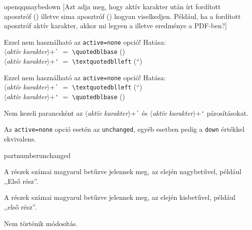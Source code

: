 \documentclass[12pt]{article}
\newcommand\param[1]{{\normalfont\slshape$\langle$#1$\rangle$}}
\begin{document}
\begin{description}
\begin{hunopt}{openqq}{maybedown}
[Azt adja meg, hogy aktív karakter után írt fordított aposztróf (\texttt{\textasciigrave}) illetve sima aposztróf (\texttt{\textquotesingle}) hogyan viselkedjen.
Például, ha a fordított aposztróf aktív karakter, akkor mi legyen a \texttt{\textasciigrave\textasciigrave} illetve \texttt{\textasciigrave\textquotesingle} eredménye a PDF-ben?]
\item[down]
Ezzel nem használható az \texttt{active=none} opció! Hatása:\\
\param{aktív karakter}+\verb|`| $=$ \verb|\quotedblbase| (\quotedblbase)\\
\param{aktív karakter}+\verb|'| $=$ \verb|\textquotedblleft| (\textquotedblleft)
\item[up]
Ezzel nem használható az \texttt{active=none} opció! Hatása:\\
\param{aktív karakter}+\verb|`| $=$ \verb|\textquotedblleft| (\textquotedblleft)\\
\param{aktív karakter}+\verb|'| $=$ \verb|\quotedblbase| (\quotedblbase)
\item[unchanged]
Nem kezeli parancsként az \param{aktív karakter}+\verb|`| és \param{aktív karakter}+\verb|'| párosításokat.
\item[maybedown]
Az \texttt{active=none} opció esetén az \texttt{unchanged}, egyéb esetben pedig a \texttt{down} értékkel ekvivalens.
\end{hunopt}

\begin{hunopt}{partnumber}{unchanged}
\item[Huordinal]
A részek számai magyarul betűzve jelennek meg, az elején nagybetűvel, például ,,Első rész''.
\item[huordinal]
A részek számai magyarul betűzve jelennek meg, az elején kisbetűvel, például ,,első rész''.
\item[unchanged]
Nem történik módosítás.
\end{hunopt}


\end{description}
\end{document}
